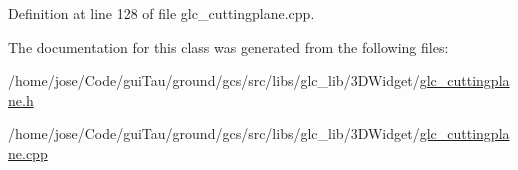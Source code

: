Definition at line 128 of file glc\-\_\-cuttingplane.\-cpp.



The documentation for this class was generated from the following files\-:\begin{DoxyCompactItemize}
\item 
/home/jose/\-Code/gui\-Tau/ground/gcs/src/libs/glc\-\_\-lib/3\-D\-Widget/\hyperlink{glc__cuttingplane_8h}{glc\-\_\-cuttingplane.\-h}\item 
/home/jose/\-Code/gui\-Tau/ground/gcs/src/libs/glc\-\_\-lib/3\-D\-Widget/\hyperlink{glc__cuttingplane_8cpp}{glc\-\_\-cuttingplane.\-cpp}\end{DoxyCompactItemize}

